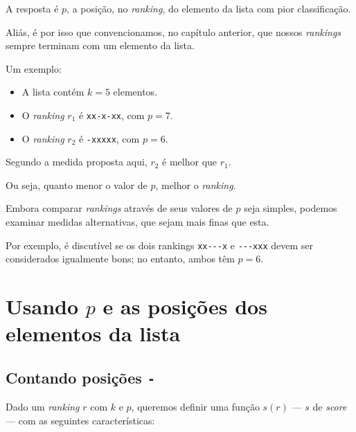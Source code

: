 \documentclass[
  letterpaper,
  DIV=11,
  numbers=noendperiod]{scrreprt}
\begin{document}
A resposta é $p$, a posição, no \emph{ranking}, do elemento da lista com
pior classificação.

Aliás, é por isso que convencionamos, no capítulo anterior, que nossos
\emph{rankings} sempre terminam com um elemento da lista.

Um exemplo:

\begin{itemize}
\item
  A lista contém $k = 5$ elementos.
\item
  O \emph{ranking} $r_1$ é \texttt{xx-x-xx}, com $p = 7$.
\item
  O \emph{ranking} $r_2$ é \texttt{-xxxxx}, com $p = 6$.
\end{itemize}

Segundo a medida proposta aqui, $r_2$ é melhor que $r_1$.

Ou seja, quanto menor o valor de $p$, melhor o \emph{ranking}.

Embora comparar \emph{rankings} através de seus valores de $p$ seja
simples, podemos examinar medidas alternativas, que sejam mais finas que
esta.

Por exemplo, é discutível se os dois rankings \texttt{xx-\/-\/-x} e
\texttt{-\/-\/-xxx} devem ser considerados igualmente bons; no entanto,
ambos têm $p = 6$.

\section{\texorpdfstring{Usando $p$ e as posições dos elementos da
lista}{Usando  e as posições dos elementos da lista}}\label{usando-p-e-as-posiuxe7uxf5es-dos-elementos-da-lista}

\subsection{\texorpdfstring{Contando posições
\texttt{-}}{Contando posições -}}\label{contando-posiuxe7uxf5es--}

Dado um \emph{ranking} $r$ com $k$ e $p$, queremos definir uma função
$s(r)$ --- $s$ de \emph{score} --- com as seguintes características:
\end{document}

